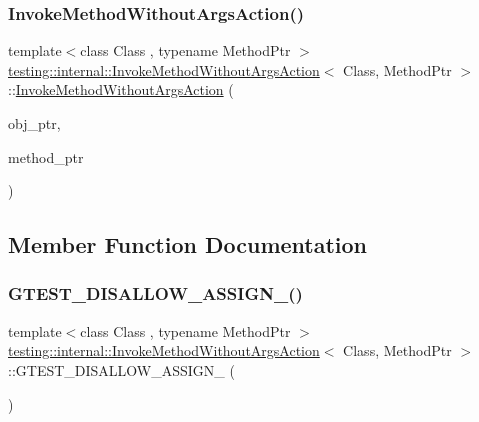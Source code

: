 \subsubsection{\texorpdfstring{InvokeMethodWithoutArgsAction()}{InvokeMethodWithoutArgsAction()}}
{\footnotesize\ttfamily template$<$class Class , typename Method\+Ptr $>$ \\
\mbox{\hyperlink{structtesting_1_1internal_1_1_invoke_method_without_args_action}{testing\+::internal\+::\+Invoke\+Method\+Without\+Args\+Action}}$<$ Class, Method\+Ptr $>$\+::\mbox{\hyperlink{structtesting_1_1internal_1_1_invoke_method_without_args_action}{Invoke\+Method\+Without\+Args\+Action}} (\begin{DoxyParamCaption}\item[{Class $\ast$}]{obj\+\_\+ptr,  }\item[{Method\+Ptr}]{method\+\_\+ptr }\end{DoxyParamCaption})\hspace{0.3cm}{\ttfamily [inline]}}



\subsection{Member Function Documentation}
\mbox{\label{structtesting_1_1internal_1_1_invoke_method_without_args_action_a4a2d094368220a3f68ee0648cd93372a}} 
\subsubsection{\texorpdfstring{GTEST\_DISALLOW\_ASSIGN\_()}{GTEST\_DISALLOW\_ASSIGN\_()}}
{\footnotesize\ttfamily template$<$class Class , typename Method\+Ptr $>$ \\
\mbox{\hyperlink{structtesting_1_1internal_1_1_invoke_method_without_args_action}{testing\+::internal\+::\+Invoke\+Method\+Without\+Args\+Action}}$<$ Class, Method\+Ptr $>$\+::G\+T\+E\+S\+T\+\_\+\+D\+I\+S\+A\+L\+L\+O\+W\+\_\+\+A\+S\+S\+I\+G\+N\+\_\+ (\begin{DoxyParamCaption}\item[{\mbox{\hyperlink{structtesting_1_1internal_1_1_invoke_method_without_args_action}{Invoke\+Method\+Without\+Args\+Action}}$<$ Class, Method\+Ptr $>$}]{ }\end{DoxyParamCaption})\hspace{0.3cm}{\ttfamily [private]}}


